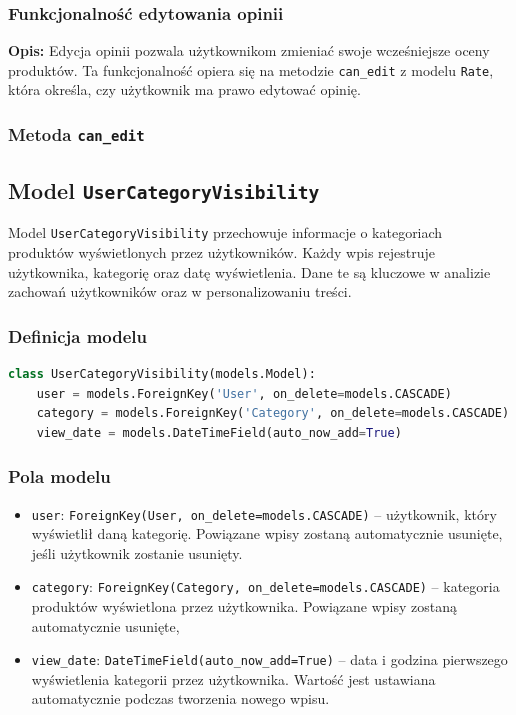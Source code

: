 \documentclass[12pt,a4paper,oneside]{article}
\theoremstyle{definition}
\numberwithin{equation}{section}
\begin{document}
\subsubsection{Funkcjonalność edytowania opinii}

\textbf{Opis:}  
Edycja opinii pozwala użytkownikom zmieniać swoje wcześniejsze oceny produktów. Ta funkcjonalność opiera się na metodzie \texttt{can\_edit} z modelu \texttt{Rate}, która określa, czy użytkownik ma prawo edytować opinię.

\subsubsection*{Metoda \texttt{can\_edit}}


% 
% 
\clearpage
\subsection{Model \texttt{UserCategoryVisibility}}

Model \texttt{UserCategoryVisibility} przechowuje informacje o kategoriach produktów wyświetlonych przez użytkowników. Każdy wpis rejestruje użytkownika, kategorię oraz datę wyświetlenia. Dane te są kluczowe w analizie zachowań użytkowników oraz w personalizowaniu treści.

\subsubsection{Definicja modelu}
\begin{lstlisting}[language=Python, caption={Model \texttt{UserCategoryVisibility}}]
class UserCategoryVisibility(models.Model):
    user = models.ForeignKey('User', on_delete=models.CASCADE)
    category = models.ForeignKey('Category', on_delete=models.CASCADE)
    view_date = models.DateTimeField(auto_now_add=True)
\end{lstlisting}

\subsubsection{Pola modelu}
\begin{itemize}
    \item \texttt{user}: \texttt{ForeignKey(User, on\_delete=models.CASCADE)} – użytkownik, który wyświetlił daną kategorię. Powiązane wpisy zostaną automatycznie usunięte, jeśli użytkownik zostanie usunięty.
    \item \texttt{category}: \texttt{ForeignKey(Category, on\_delete=models.CASCADE)} – kategoria produktów wyświetlona przez użytkownika. Powiązane wpisy zostaną automatycznie usunięte,
    \item \texttt{view\_date}: \texttt{DateTimeField(auto\_now\_add=True)} – data i godzina pierwszego wyświetlenia kategorii przez użytkownika. Wartość jest ustawiana automatycznie podczas tworzenia nowego wpisu.
\end{itemize}
\end{document}
